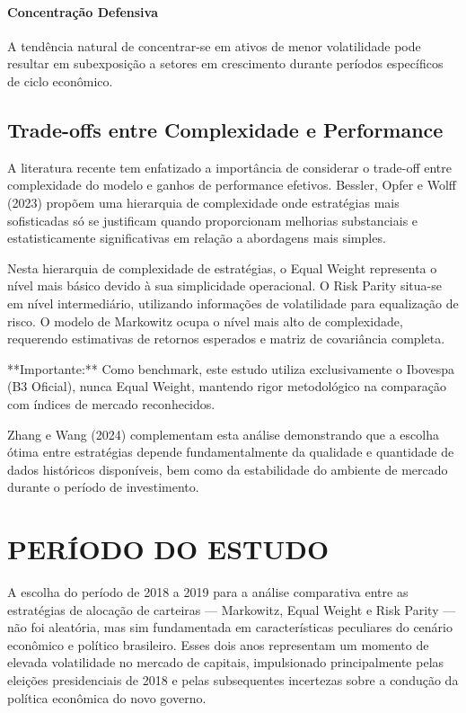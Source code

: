 \paragraph{Concentração Defensiva}
A tendência natural de concentrar-se em ativos de menor volatilidade pode resultar em subexposição a setores em crescimento durante períodos específicos de ciclo econômico.

\subsection{Trade-offs entre Complexidade e Performance}

A literatura recente tem enfatizado a importância de considerar o trade-off entre complexidade do modelo e ganhos de performance efetivos. Bessler, Opfer e Wolff (2023) propõem uma hierarquia de complexidade onde estratégias mais sofisticadas só se justificam quando proporcionam melhorias substanciais e estatisticamente significativas em relação a abordagens mais simples.

Nesta hierarquia de complexidade de estratégias, o Equal Weight representa o nível mais básico devido à sua simplicidade operacional. O Risk Parity situa-se em nível intermediário, utilizando informações de volatilidade para equalização de risco. O modelo de Markowitz ocupa o nível mais alto de complexidade, requerendo estimativas de retornos esperados e matriz de covariância completa. 

**Importante:** Como benchmark, este estudo utiliza exclusivamente o Ibovespa (B3 Oficial), nunca Equal Weight, mantendo rigor metodológico na comparação com índices de mercado reconhecidos.

Zhang e Wang (2024) complementam esta análise demonstrando que a escolha ótima entre estratégias depende fundamentalmente da qualidade e quantidade de dados históricos disponíveis, bem como da estabilidade do ambiente de mercado durante o período de investimento.

\section{PERÍODO DO ESTUDO}

A escolha do período de 2018 a 2019 para a análise comparativa entre as estratégias de alocação de carteiras --- Markowitz, Equal Weight e Risk Parity --- não foi aleatória, mas sim fundamentada em características peculiares do cenário econômico e político brasileiro. Esses dois anos representam um momento de elevada volatilidade no mercado de capitais, impulsionado principalmente pelas eleições presidenciais de 2018 e pelas subsequentes incertezas sobre a condução da política econômica do novo governo.

